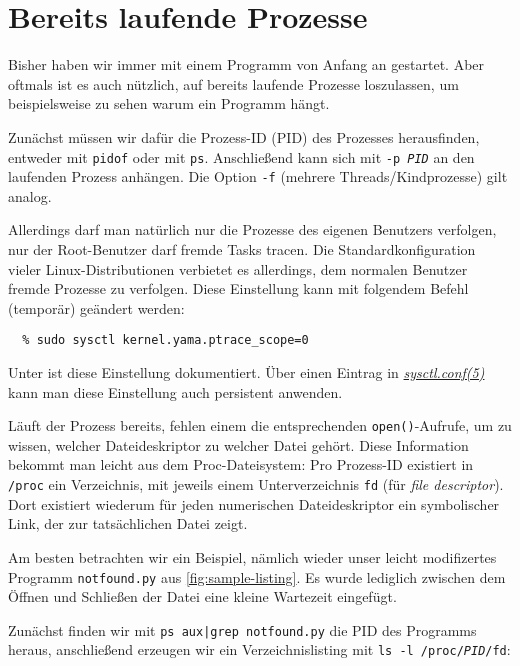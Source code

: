 \section{Bereits laufende Prozesse}

Bisher haben wir \strace{} immer mit einem Programm von Anfang an gestartet. Aber oftmals
ist es auch nützlich, \strace{} auf bereits laufende Prozesse loszulassen, um beispielsweise zu
sehen warum ein Programm hängt.

Zunächst müssen wir dafür die Prozess-ID (PID) des Prozesses herausfinden, entweder mit
\texttt{pidof} oder mit \texttt{ps}. Anschließend kann sich \strace{} mit \texttt{-p \emph{PID}}
an den laufenden Prozess anhängen. Die Option \texttt{-f} (mehrere Threads/Kindprozesse) gilt
analog.


Allerdings darf man natürlich nur die Prozesse des eigenen Benutzers verfolgen, nur der
Root-Benutzer darf fremde Tasks tracen. Die Standardkonfiguration vieler Linux-Distributionen
verbietet es allerdings, dem normalen Benutzer fremde Prozesse zu verfolgen. Diese Einstellung
kann mit folgendem Befehl (temporär) geändert werden:

\begin{lstlisting}
  % sudo sysctl kernel.yama.ptrace_scope=0
\end{lstlisting}

Unter \cite{yama} ist diese Einstellung dokumentiert. Über einen Eintrag in
\href{http://man7.org/linux/man-pages/man5/sysctl.conf.5.html}{\emph{sysctl.conf(5)}} kann man
diese Einstellung auch persistent anwenden.



Läuft der Prozess bereits, fehlen einem die entsprechenden \texttt{open()}-Aufrufe, um zu wissen,
welcher Dateideskriptor zu welcher Datei gehört. Diese Information bekommt man leicht aus dem
Proc-Dateisystem: Pro Prozess-ID existiert in \texttt{/proc} ein Verzeichnis, mit jeweils einem
Unterverzeichnis \texttt{fd} (für \emph{file descriptor}). Dort existiert wiederum für jeden
numerischen Dateideskriptor ein symbolischer Link, der zur tatsächlichen Datei zeigt.

Am besten betrachten wir ein Beispiel, nämlich wieder unser leicht modifizertes Programm
\texttt{notfound.py} aus \autoref{fig:sample-listing}. Es wurde lediglich zwischen dem Öffnen
und Schließen der Datei eine kleine Wartezeit eingefügt.

Zunächst finden wir mit \texttt{ps aux|grep notfound.py} die PID des Programms heraus, anschließend
erzeugen wir ein Verzeichnislisting mit \texttt{ls -l /proc/\emph{PID}/fd}:

